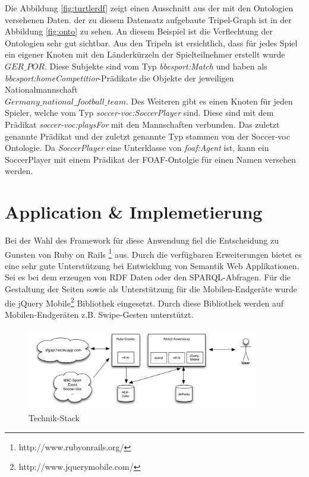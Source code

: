 \documentclass[runningheads,a4paper]{llncs}
\begin{document}
Die Abbildung \ref{fig:turtlerdf} zeigt einen Ausschnitt aus der mit den Ontologien versehenen Daten. der zu diesem Datensatz aufgebaute Tripel-Graph ist in der Abbildung \ref{fig:onto} zu sehen. An diesem Beispiel ist die Verflechtung der Ontologien sehr gut sichtbar.
Aus den Tripeln ist ersichtlich, dass für jedes Spiel ein eigener Knoten mit den Länderkürzeln der Spielteilnehmer erstellt wurde \(GER\_POR\). Diese Subjekte sind vom Typ \textit{bbcsport:Match} und haben als \textit{bbcsport:homeCompetitior}-Prädikate die Objekte der jeweiligen Nationalmannschaft\\ \(Germany\_national\_football\_team\). 
Des Weiteren gibt es einen Knoten für jeden Spieler, welche vom Typ \textit{soccer-voc:SoccerPlayer} sind. Diese sind mit dem Prädikat \textit{soccer-voc:playsFor} mit den Mannschaften verbunden. Das zuletzt genannte Prädikat und der zuletzt genannte Typ stammen von der Soccer-voc Ontologie. Da \textit{SoccerPlayer} eine Unterklasse von \textit{foaf:Agent} ist, kann ein SoccerPlayer mit einem Prädikat der FOAF-Ontolgie für einen Namen versehen werden.
\section{Application \& Implemetierung}


Bei der Wahl des Framework für diese Anwendung fiel die Entscheidung zu Gunsten von Ruby on Rails \footnote{http://www.rubyonrails.org/} aus. Durch die verfügbaren Erweiterungen bietet es eine sehr gute Unterstützung bei Entwicklung von Semantik Web Applikationen. Sei es bei dem erzeugen von RDF Daten oder den SPARQL-Abfragen. Für die Gestaltung der Seiten sowie als Unterstützung für die Mobilen-Endgeräte wurde die jQuery Mobile\footnote{http://www.jquerymobile.com/} Bibliothek eingesetzt. Durch diese Bibliothek werden auf Mobilen-Endgeräten z.B. Swipe-Gesten unterstützt. 

\begin{figure}
\centering
\includegraphics[height=3.6cm]{technik-stack}
\caption{Technik-Stack}
\label{fig:example}
\end{figure}
\end{document}
